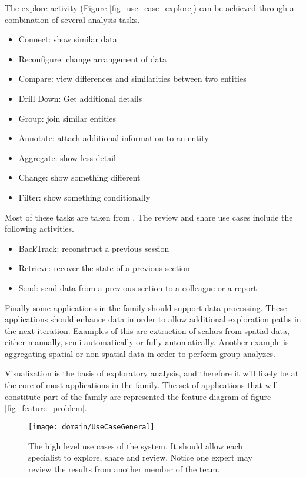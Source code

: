 The explore activity (Figure \ref{fig_use_case_explore}) can be achieved through a combination of several analysis tasks.
\begin{itemize}
	\item Connect: show similar data
	\item Reconfigure: change arrangement of data
	\item Compare: view differences and similarities between two entities
	\item Drill Down: Get additional details
	\item Group: join similar entities
	\item Annotate: attach additional information to an entity
	\item Aggregate: show less detail
	\item Change: show something different
	\item Filter: show something conditionally
\end{itemize}
 Most of these tasks are taken from \autocite{yi_toward_2007}. The review and share use cases include the following activities. 
\begin{itemize}
	\item BackTrack: reconstruct a previous session
	\item Retrieve: recover the state of a previous section
	\item Send: send data from a previous section to a colleague or a report
\end{itemize}
Finally some applications in the family should support data processing. These applications should enhance data in order to allow additional exploration paths in the next iteration. Examples of this are extraction of scalars from spatial data, either manually, semi-automatically or fully automatically. Another example is aggregating spatial or non-spatial data in order to perform group analyzes.
 
Visualization is the basis of exploratory analysis, and therefore it will likely be at the core of most applications in the family. The set of applications that will constitute part of the family are represented the feature diagram of figure \ref{fig_feature_problem}.

\begin{figure}
\centering
\texttt{[image: domain/UseCaseGeneral]}
\caption{The high level use cases of the system. It should allow each specialist to explore, share and review. Notice one expert may review the results from another member of the team.\label{fig_use_case_general}}
\end{figure}

